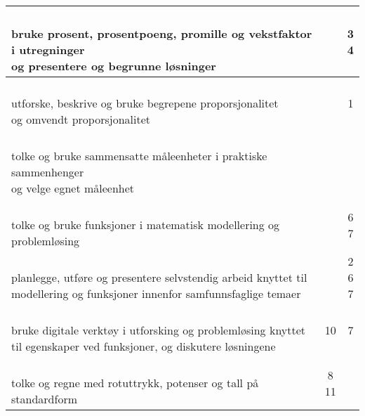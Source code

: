 \documentclass{article}
\begin{document}
\begin{center}
\begin{tabular}{p{10.5cm} | c | c |}
		\shortstack[l]{\\ bruke prosent, prosentpoeng, promille og vekstfaktor i utregninger \\og presentere og begrunne løsninger
		} &\shortstack{} &\shortstack{3\\4} \\ \hline
		
		\shortstack[l]{\\ utforske, beskrive og bruke begrepene proporsjonalitet\\ og omvendt proporsjonalitet
		} &\shortstack{} &\shortstack{1\\{}} \\ \hline
		
		\shortstack[l]{\\ tolke og bruke sammensatte måleenheter i praktiske sammenhenger\\ og velge egnet måleenhet
		} &\shortstack{} &\shortstack{1} \\ \hline
		
		\shortstack[l]{\\ tolke og bruke funksjoner i matematisk modellering og problemløsing \\\phantom{text}
		} &\shortstack{} &\shortstack{6\\7} \\ \hline
	
		\shortstack[l]{\\planlegge, utføre og presentere selvstendig arbeid knyttet til \\modellering og funksjoner innenfor samfunnsfaglige temaer\\ \phantom{text}
		} &\shortstack{} &\shortstack{2\\6\\7} \\ \hline
		
		
		\shortstack[l]{\\bruke digitale verktøy i utforsking og problemløsing knyttet\\ til egenskaper ved funksjoner, og diskutere løsningene
		} &\shortstack{10\\{}} &\shortstack{7\\{}} \\ \hline
				
		\shortstack[l]{\\tolke og regne med rotuttrykk, potenser og tall på standardform \\ \phantom{a}
		} &\shortstack{8\\11} &\shortstack{} \\ \hline
	\end{tabular}	
\end{center} \vspace{20pt}
\end{document}

